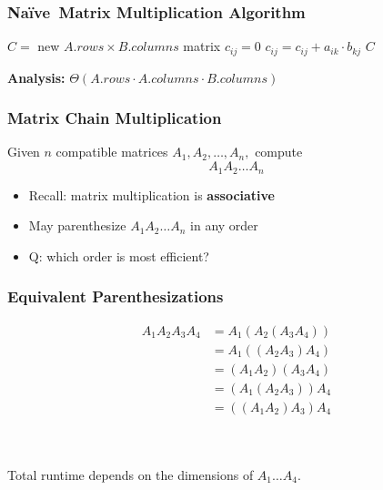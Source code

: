 \documentclass{beamer}
\newcommand{\stanza}{ \\~\ }
\newcommand{\Naive}{Na\"{i}ve~}
\begin{document}
\begin{frame} \frametitle{\Naive Matrix Multiplication Algorithm}
  {\small
  \begin{algorithmic}[1]
    \State $C = $ new $A.rows \times B.columns$ matrix
        \State $c_{ij} = 0$
          \State $c_{ij} = c_{ij} + a_{ik} \cdot b_{kj}$
        \EndFor
      \EndFor
    \EndFor
    \State \Return $C$
    \EndFunction
  \end{algorithmic}
  }
  
  \textbf{Analysis:} $\Theta(A.rows \cdot A.columns \cdot B.columns)$
\end{frame}

\begin{frame} \frametitle{Matrix Chain Multiplication}
  Given $n$ compatible matrices $A_1, A_2, \ldots, A_n,$ compute
  \[ A_1 A_2 \ldots A_n \]

  \begin{itemize}
    \item Recall: matrix multiplication is \textbf{associative}
    \item May parenthesize $ A_1 A_2 \ldots A_n $ in any order
    \item Q: which order is most efficient?
  \end{itemize}
\end{frame}

\begin{frame} \frametitle{Equivalent Parenthesizations}
 \begin{align*}
    A_1 A_2 A_3 A_4
    &= A_1 (A_2(A_3 A_4)) \\
    &= A_1 ((A_2 A_3) A_4) \\
    &= (A_1 A_2) (A_3 A_4) \\
    &= (A_1 (A_2 A_3)) A_4 \\
    &= ((A_1 A_2) A_3) A_4
  \end{align*}
\stanza

\begin{center}
  Total runtime depends on the dimensions of $A_1 \ldots A_4.$
\end{center}
\end{frame}
\end{document}
